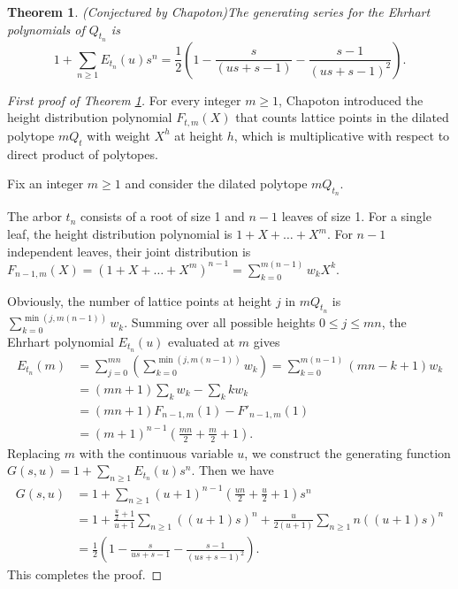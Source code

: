 \documentclass[reqno, 12pt]{article}
\newtheorem{thm}{Theorem}[section]
\theoremstyle{mydefinition}
\theoremstyle{myremark}
\begin{document}
\begin{thm}{\em (Conjectured by Chapoton)}\label{Arbor-Theorem-3}
The generating series for the Ehrhart polynomials of $Q_{t_n}$ is
\[ 1 + \sum_{n \ge 1} E_{t_n}(u) s^n = \frac{1}{2} \left( 1 - \frac{s}{(us + s - 1)} - \frac{s - 1}{(us + s - 1)^2} \right). \]
\end{thm}
\begin{proof}[First proof of Theorem \ref{Arbor-Theorem-3}]
For every integer $m\geq 1$, Chapoton \cite{Chapoton} introduced the height distribution polynomial $F_{t,m}(X)$ that counts lattice points in the dilated polytope $mQ_{t}$ with weight $X^{h}$ at height $h$, which is multiplicative with respect to direct product of polytopes.

Fix an integer $m\geq 1$ and consider the dilated polytope $mQ_{t_{n}}$.

The arbor $t_n$ consists of a root of size 1 and $n-1$ leaves of size 1. For a single leaf, the height distribution polynomial is $1+X+\dots+X^m$. For $n-1$ independent leaves, their joint distribution is $F_{n-1,m}(X) = (1+X+\dots+X^m)^{n-1} = \sum\limits_{k=0}^{m(n-1)} w_k X^k$.

Obviously, the number of lattice points at height $j$ in $m Q_{t_n}$ is $\sum\limits_{k=0}^{\min(j, m(n-1))} w_k$. Summing over all possible heights $0 \le j \le mn$, the Ehrhart polynomial $E_{t_n}(u)$ evaluated at $m$ gives
\begin{align*}
E_{t_n}(m) &= \sum_{j=0}^{mn}\left(\sum_{k=0}^{\min(j, m(n-1))} w_k\right)=\sum_{k=0}^{m(n-1)} (mn - k + 1) w_k \\
&= (mn+1)\sum_{k} w_k - \sum_{k} k w_k \\
&= (mn+1)F_{n-1,m}(1) - F'_{n-1,m}(1) \\
&= (m+1)^{n-1}\left(\frac{mn}{2} + \frac{m}{2} + 1\right).
\end{align*}
Replacing $m$ with the continuous variable $u$, we construct the generating function $G(s, u) = 1 + \sum\limits_{n\geq1}E_{t_n}(u)s^n$. Then we have
\begin{align*}
G(s, u) &= 1 + \sum_{n\geq1}  (u+1)^{n-1}\left(\frac{un}{2} + \frac{u}{2} + 1\right)s^n\\
&= 1+\frac{\frac{u}{2}+1}{u+1}\sum_{n\geq1}\left((u+1)s\right)^n+\frac{u}{2(u+1)}\sum_{n\geq1}n((u+1)s)^{n}
\\
&=\frac{1}{2}\left(1-\frac{s}{us+s-1}-\frac{s-1}{(us+s-1)^2}\right).
\end{align*}
This completes the proof.
\end{proof}
\end{document}
